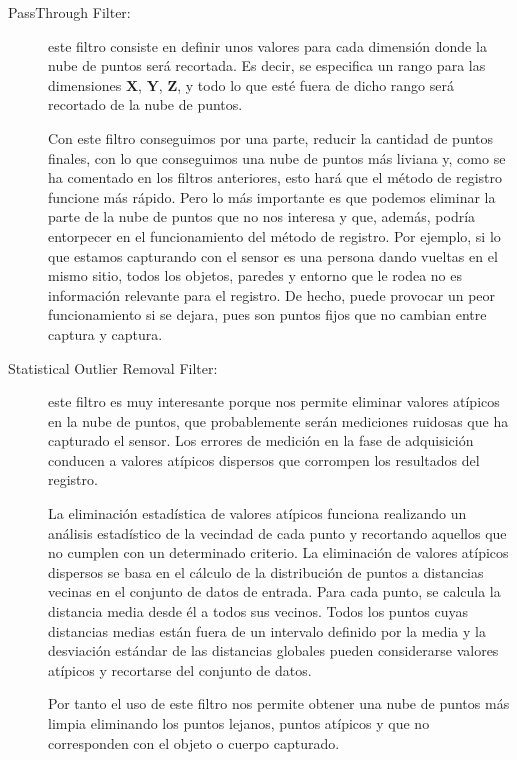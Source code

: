 \begin{description}
    \item[PassThrough Filter:]
    
    este filtro consiste en definir unos valores para cada dimensión donde la nube de puntos será recortada.
    Es decir, se especifica un rango para las dimensiones $\mathbf{X}$, $\mathbf{Y}$, $\mathbf{Z}$, y todo lo que esté fuera de dicho rango será recortado de la nube de puntos.

    Con este filtro conseguimos por una parte, reducir la cantidad de puntos finales, con lo que conseguimos una nube de puntos más liviana y, como se ha comentado en los filtros anteriores, esto hará que el método de registro funcione más rápido.
    Pero lo más importante es que podemos eliminar la parte de la nube de puntos que no nos interesa y que, además, podría entorpecer en el funcionamiento del método de registro.
    Por ejemplo, si lo que estamos capturando con el sensor es una persona dando vueltas en el mismo sitio, todos los objetos, paredes y entorno que le rodea no es información relevante para el registro.
    De hecho, puede provocar un peor funcionamiento si se dejara, pues son puntos fijos que no cambian entre captura y captura.

    \item[Statistical Outlier Removal Filter:]
    
    este filtro es muy interesante porque nos permite eliminar valores atípicos en la nube de puntos, que probablemente serán mediciones ruidosas que ha capturado el sensor.
    Los errores de medición en la fase de adquisición conducen a valores atípicos dispersos que corrompen los resultados del registro.

    La eliminación estadística de valores atípicos funciona realizando un análisis estadístico de la vecindad de cada punto y recortando aquellos que no cumplen con un determinado criterio.
    La eliminación de valores atípicos dispersos se basa en el cálculo de la distribución de puntos a distancias vecinas en el conjunto de datos de entrada.
    Para cada punto, se calcula la distancia media desde él a todos sus vecinos.
    Todos los puntos cuyas distancias medias están fuera de un intervalo definido por la media y la desviación estándar de las distancias globales pueden considerarse valores atípicos y recortarse del conjunto de datos.

    Por tanto el uso de este filtro nos permite obtener una nube de puntos más limpia eliminando los puntos lejanos, puntos atípicos y que no corresponden con el objeto o cuerpo capturado.


\end{description}
